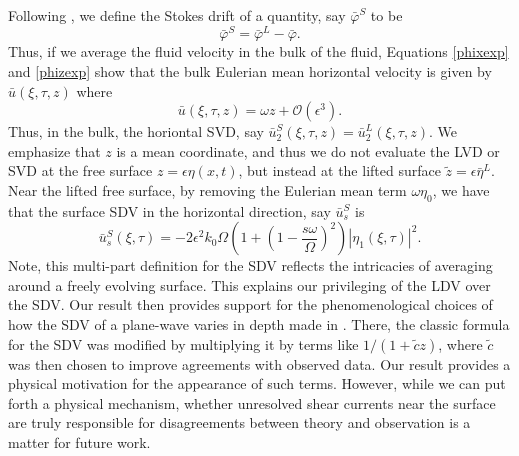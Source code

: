 \documentclass{JFM_Style/jfm}
\begin{document}
Following \cite{andrews}, we define the Stokes drift of a quantity, say $\bar{\varphi}^{S}$ to be
\[
\bar{\varphi}^{S} = \bar{\varphi}^{L} - \bar{\varphi}.
\]
Thus, if we average the fluid velocity in the bulk of the fluid, Equations \eqref{phixexp} and \eqref{phizexp} show that the bulk Eulerian mean horizontal velocity is given by $\bar{u}(\xi,\tau,z)$ where
\[
\bar{u}(\xi,\tau,z) = \omega z + \mathcal{O}(\epsilon^{3}).
\]
Thus, in the bulk, the horiontal SVD, say $\bar{u}^{S}_{2}(\xi,\tau,z) = \bar{u}^{L}_{2}(\xi,\tau,z)$.  We emphasize that $z$ is a mean coordinate, and thus we do not evaluate the LVD or SVD at the free surface $z=\epsilon \eta(x,t)$, but instead at the lifted surface $\tilde{z}=\epsilon \bar{\eta}^{L}$.  Near the lifted free surface, by removing the Eulerian mean term $\omega \eta_{0}$, we have that the surface SDV in the horizontal direction, say $\bar{u}^{S}_{s}$ is
\begin{equation}
\bar{u}^{S}_{s}(\xi,\tau) = -2\epsilon^{2}k_{0}\Omega\left(1 + \left(1-\frac{s\omega}{\Omega} \right)^{2}\right)|\eta_{1}(\xi,\tau)|^{2}.
\label{surfSDV}
\end{equation}
Note, this multi-part definition for the SDV reflects the intricacies of averaging around a freely evolving surface.  This explains our privileging of the LDV over the SDV.  Our result then provides support for the phenomenological choices of how the SDV of a plane-wave varies in depth made in \cite{breivik}.  There, the classic formula for the SDV was modified by multiplying it by terms like $1/(1+\tilde{c}z)$, where $\tilde{c}$ was then chosen to improve agreements with observed data.  Our result provides a physical motivation for the appearance of such terms.  However, while we can put forth a physical mechanism, whether unresolved shear currents near the surface are truly responsible for disagreements between theory and observation is a matter for future work.
\end{document}
